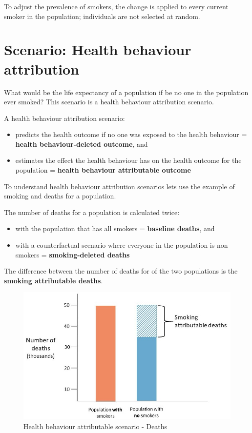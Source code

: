 \documentclass[]{book}
\providecommand{\tightlist}{%
  \setlength{\itemsep}{0pt}\setlength{\parskip}{0pt}}
\begin{document}
To adjust the prevalence of smokers, the change is applied to every
current smoker in the population; individuals are not selected at
random.

\section{Scenario: Health behaviour
attribution}\label{scenario-health-behaviour-attribution}

What would be the life expectancy of a population if be no one in the
population ever smoked? This scenario is a health behaviour attribution
scenario.

A health behaviour attribution scenario:

\begin{itemize}
\item
  predicts the health outcome if no one was exposed to the health
  behaviour = \textbf{health behaviour-deleted outcome}, and
\item
  estimates the effect the health behaviour has on the health outcome
  for the population = \textbf{health behaviour attributable outcome}
\end{itemize}

To understand health behaviour attribution scenarios lets use the
example of smoking and deaths for a population.

The number of deaths for a population is calculated twice:

\begin{itemize}
\tightlist
\item
  with the population that has all smokers = \textbf{baseline deaths},
  and
\item
  with a counterfactual scenario where everyone in the population is
  non-smokers = \textbf{smoking-deleted deaths}
\end{itemize}

The difference between the number of deaths for of the two populations
is the \textbf{smoking attributable deaths}.

\begin{figure}

{\centering \includegraphics{Images/HB attributable number of deaths} 

}

\caption{Health behaviour attributable scenario - Deaths}\label{fig:unnamed-chunk-13}
\end{figure}
\end{document}
